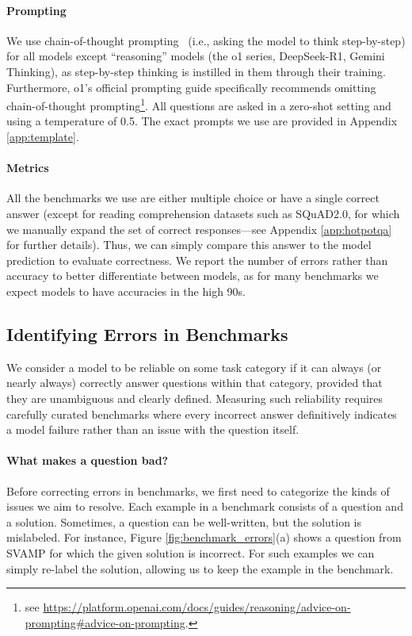 \paragraph{Prompting}
We use chain-of-thought prompting~\cite{wei2022chain} (i.e., asking the model to think step-by-step) for all models except ``reasoning'' models (the o1 series, DeepSeek-R1, Gemini Thinking), as step-by-step thinking is instilled in them through their training. Furthermore, o1's official prompting guide specifically recommends omitting chain-of-thought prompting\footnote{see \url{https://platform.openai.com/docs/guides/reasoning/advice-on-prompting\#advice-on-prompting}.}. All
questions are asked in a zero-shot setting and using a temperature of 0.5. The exact prompts we use are provided in Appendix \ref{app:template}.

\paragraph{Metrics}
All the benchmarks we use are either multiple choice or have a single correct answer (except for reading comprehension datasets such as SQuAD2.0, for which we manually expand the set of correct responses---see Appendix \ref{app:hotpotqa} for further details). Thus, we can simply compare this answer to the model prediction to evaluate correctness. We  report the number of errors rather than accuracy to better differentiate between models, as for many benchmarks we expect models to have accuracies in the high 90s.



\subsection{Identifying Errors in Benchmarks}\label{sec:identify-bad-questions}
We consider a model to be reliable on some task category if it can always (or nearly always) correctly answer questions within that category, provided that they are unambiguous and clearly defined. Measuring such reliability requires carefully curated benchmarks where every incorrect answer definitively indicates a model failure rather than an issue with the question itself.


\paragraph{What makes a question bad?} Before correcting errors in benchmarks, we first need to categorize the kinds of issues we aim to resolve. Each example in a benchmark consists of a question and a solution. Sometimes, a question can be well-written, but the solution is mislabeled. For instance, Figure \ref{fig:benchmark_errors}(a) shows a question from SVAMP for which the given solution is incorrect. For such examples we can simply re-label the solution, allowing us to keep the example in the benchmark. 


